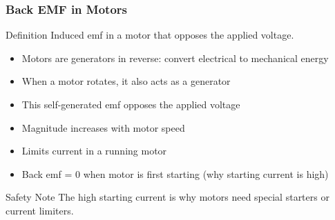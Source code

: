 \documentclass{beamer}
\begin{document}
\begin{frame}
\frametitle{Back EMF in Motors}
\begin{block}{Definition}
Induced emf in a motor that opposes the applied voltage.
\end{block}

\begin{itemize}
\item Motors are generators in reverse: convert electrical to mechanical energy
\item When a motor rotates, it also acts as a generator
\item This self-generated emf opposes the applied voltage
\item Magnitude increases with motor speed
\item Limits current in a running motor
\item Back emf = 0 when motor is first starting (why starting current is high)
\end{itemize}

\begin{alertblock}{Safety Note}
The high starting current is why motors need special starters or current limiters.
\end{alertblock}

\end{frame}
\end{document}
